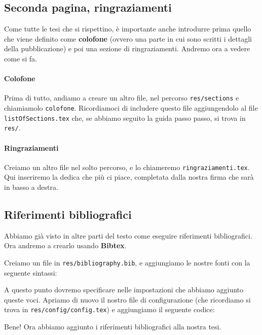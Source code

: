 \subsection{Seconda pagina, ringraziamenti}
Come tutte le tesi che si rispettino, è importante anche introdurre prima
quello che viene definito come \textbf{colofone} (ovvero una parte in cui sono
scritti i dettagli della pubblicazione) e poi una sezione di ringraziamenti.
Andremo ora a vedere come si fa.
\paragraph*{Colofone} Prima di tutto, andiamo a creare un altro
file, nel percorso \texttt{res/sections} e chiamiamolo \texttt{colofone}.
Ricordiamoci di includere questo file aggiungendolo al file
\texttt{listOfSections.tex} che, se abbiamo seguito la guida passo passo, si
trova in \texttt{res/}.



\paragraph*{Ringraziamenti} Creiamo un altro file nel solto percorso, e lo
chiameremo \texttt{ringraziamenti.tex}. Qui inseriremo la dedica che più ci
piace, completata dalla nostra firma che sarà in basso a destra.



\subsection{Riferimenti bibliografici}

Abbiamo già visto in altre parti del testo come eseguire riferimenti
bibliografici. Ora andremo a crearlo usando \textbf{Bibtex}.

Creiamo un file in \texttt{res/bibliography.bib}, e aggiungiamo le nostre fonti
con la seguente sintassi:



\noindent A questo punto dovremo specificare nelle impostazioni che abbiamo
aggiunto queste voci. Apriamo di nuovo il nostro file di configurazione (che
ricordiamo si trova in \texttt{res/config/config.tex}) e aggiungiamo il
seguente codice:



\noindent Bene! Ora abbiamo aggiunto i riferimenti bibliografici alla nostra
tesi.

